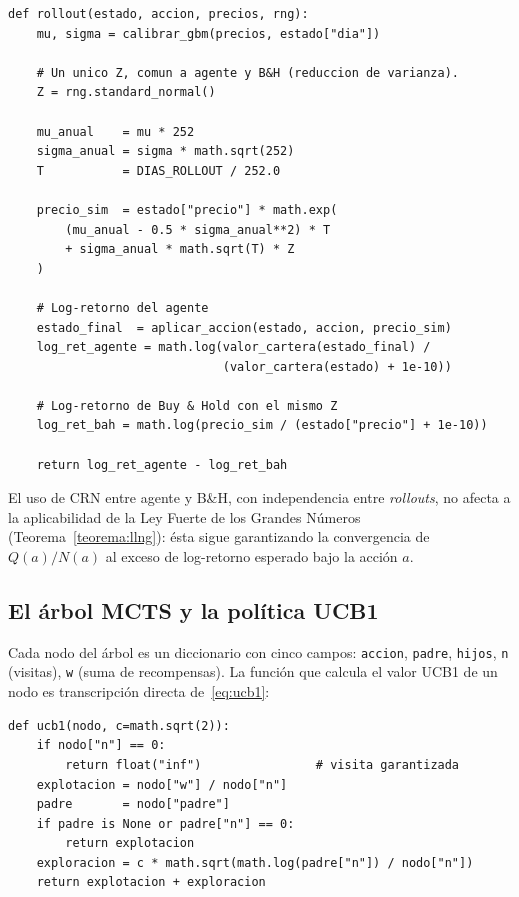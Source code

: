 \begin{lstlisting}[caption={Rollout con recompensa relativa y CRN agente/B\&H.}, label={lst:rollout}]
def rollout(estado, accion, precios, rng):
    mu, sigma = calibrar_gbm(precios, estado["dia"])

    # Un unico Z, comun a agente y B&H (reduccion de varianza).
    Z = rng.standard_normal()

    mu_anual    = mu * 252
    sigma_anual = sigma * math.sqrt(252)
    T           = DIAS_ROLLOUT / 252.0

    precio_sim  = estado["precio"] * math.exp(
        (mu_anual - 0.5 * sigma_anual**2) * T
        + sigma_anual * math.sqrt(T) * Z
    )

    # Log-retorno del agente
    estado_final  = aplicar_accion(estado, accion, precio_sim)
    log_ret_agente = math.log(valor_cartera(estado_final) /
                              (valor_cartera(estado) + 1e-10))

    # Log-retorno de Buy & Hold con el mismo Z
    log_ret_bah = math.log(precio_sim / (estado["precio"] + 1e-10))

    return log_ret_agente - log_ret_bah
\end{lstlisting}

El uso de CRN entre agente y B\&H, con independencia entre \emph{rollouts}, no afecta a la aplicabilidad de la Ley Fuerte de los Grandes Números (Teorema~\ref{teorema:llng}): ésta sigue garantizando la convergencia de $Q(a)/N(a)$ al exceso de log-retorno esperado bajo la acción $a$.

\subsection{El árbol MCTS y la política UCB1}
\label{subsec:arbol-ucb1}

Cada nodo del árbol es un diccionario con cinco campos: \texttt{accion}, \texttt{padre}, \texttt{hijos}, \texttt{n} (visitas), \texttt{w} (suma de recompensas). La función que calcula el valor UCB1 de un nodo es transcripción directa de~\eqref{eq:ucb1}:

\begin{lstlisting}[caption={Política UCB1 con $c=\sqrt{2}$.}, label={lst:ucb1}]
def ucb1(nodo, c=math.sqrt(2)):
    if nodo["n"] == 0:
        return float("inf")                # visita garantizada
    explotacion = nodo["w"] / nodo["n"]
    padre       = nodo["padre"]
    if padre is None or padre["n"] == 0:
        return explotacion
    exploracion = c * math.sqrt(math.log(padre["n"]) / nodo["n"])
    return explotacion + exploracion
\end{lstlisting}

